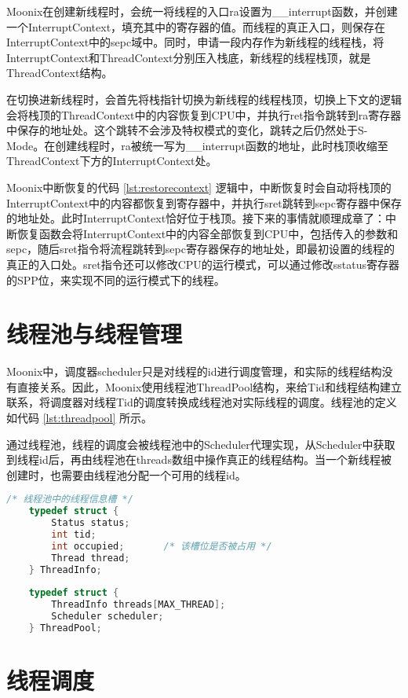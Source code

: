 Moonix在创建新线程时，会统一将线程的入口ra设置为\_\_interrupt函数，并创建一个InterruptContext，填充其中的寄存器的值。而线程的真正入口，则保存在InterruptContext中的sepc域中。同时，申请一段内存作为新线程的线程栈，将InterruptContext和ThreadContext分别压入栈底，新线程的线程栈顶，就是ThreadContext结构。

在切换进新线程时，会首先将栈指针切换为新线程的线程栈顶，切换上下文的逻辑会将栈顶的ThreadContext中的内容恢复到CPU中，并执行ret指令跳转到ra寄存器中保存的地址处。这个跳转不会涉及特权模式的变化，跳转之后仍然处于S-Mode。在创建线程时，ra被统一写为\_\_interrupt函数的地址，此时栈顶收缩至ThreadContext下方的InterruptContext处。

Moonix中断恢复的代码 \ref{lst:restorecontext} 逻辑中，中断恢复时会自动将栈顶的InterruptContext中的内容都恢复到寄存器中，并执行sret跳转到sepc寄存器中保存的地址处。此时InterruptContext恰好位于栈顶。接下来的事情就顺理成章了：中断恢复函数会将InterruptContext中的内容全部恢复到CPU中，包括传入的参数和sepc，随后sret指令将流程跳转到sepc寄存器保存的地址处，即最初设置的线程的真正的入口处。sret指令还可以修改CPU的运行模式，可以通过修改sstatus寄存器的SPP位，来实现不同的运行模式下的线程。

\section{线程池与线程管理}

Moonix中，调度器scheduler只是对线程的id进行调度管理，和实际的线程结构没有直接关系。因此，Moonix使用线程池ThreadPool结构，来给Tid和线程结构建立联系，将调度器对线程Tid的调度转换成线程池对实际线程的调度。线程池的定义如代码 \ref{lst:threadpool} 所示。

通过线程池，线程的调度会被线程池中的Scheduler代理实现，从Scheduler中获取到线程id后，再由线程池在threads数组中操作真正的线程结构。当一个新线程被创建时，也需要由线程池分配一个可用的线程id。

\begin{minipage}[c]{0.95\textwidth}
\begin{lstlisting}[language={C}, caption={线程池定义}, label={lst:threadpool}]
	/* 线程池中的线程信息槽 */
	typedef struct {
		Status status;
		int tid;
		int occupied;       /* 该槽位是否被占用 */
		Thread thread;
	} ThreadInfo;
	
	typedef struct {
		ThreadInfo threads[MAX_THREAD];
		Scheduler scheduler;
	} ThreadPool;
\end{lstlisting}
\end{minipage}

\section{线程调度}

